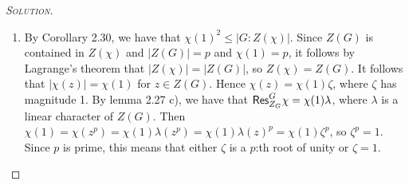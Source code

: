 \begin{proof}[{\scshape Solution}]
  \hfill
  \begin{enumerate}[font=\normalfont,label=\textbf{(\Alph*)}, wide]


    \item By Corollary 2.30, we have that $\chi(1)^2 \leq \lvert G : Z(\chi) \rvert$. Since $Z(G)$ is contained in $Z(\chi)$ and $\lvert Z(G) \rvert = p$ and $\chi(1) = p$, it follows by Lagrange's theorem that $\lvert Z(\chi)\rvert = \lvert Z(G) \rvert$, so $Z(\chi) = Z(G)$. It follows that $\lvert \chi(z) \rvert = \chi(1)$ for $z\in Z(G)$. Hence $\chi(z) = \chi(1)\zeta$, where $\zeta$ has magnitude 1. By lemma 2.27 c), we have that $\mathsf{Res}^{G}_{Z_G}\chi = \chi(1) \lambda$, where $\lambda$ is a linear character of $Z(G)$. Then $\chi(1) = \chi(z^p) = \chi(1) \lambda(z^p) = \chi(1) \lambda(z)^p = \chi(1)\zeta^p$, so $\zeta^p = 1$. Since $p$ is prime, this means that either $\zeta$ is a $p$:th root of unity or $\zeta = 1$.


\end{enumerate}
\end{proof}
